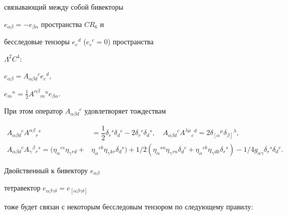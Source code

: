 связывающий между собой бивекторы


$e_{\alpha\beta}=-e_{\beta\alpha}$ пространства $CR_6$ и


бесследовые тензоры $e_c{}^d$ ($e_c{}^c=0$) пространства


$\Lambda^2C^4$:


$e_{\alpha \beta}= A_{\alpha \beta d}{}^ce_c{}^d$,


$e_m{}^n=\frac{1}{2}A^{\alpha\beta}{}_m{}^ne_{\beta\alpha}$.


При этом оператор $A_{\alpha \beta d}{}^c$ удовлетворяет тождествам


\begin{equation}


\begin{split}


A_{\alpha\beta d}{}^cA^{\alpha\beta}{}_r{}^s


&=\dfrac{1}{2}\delta_r{}^s\delta_d{}^c-


2\delta_ r{}^c\delta_d{}^s,\quad


A_{\alpha\beta d}{}^cA^{\lambda\mu}{}_c{}^d=


2\delta_{\left[\alpha \right.}{}^\mu


\delta_{\left.\beta\right]}{}^\lambda,\\


%


A_{\alpha\beta d}{}^cA_\gamma{}^\beta{}_r{}^s=


(\eta_\alpha{}^{cs}\eta_\gamma{}_{rd}+


&\eta_\alpha{}^{ck}\eta_\gamma{}_{kr}\delta_d{}^s)+


1/2(\eta_\alpha{}^{sn}\eta_\gamma{}_{rn}\delta_d{}^c+


\eta_\alpha{}^{ck}\eta_\gamma{}_{dk}\delta_r{}^s)-


1/4g_{\alpha\gamma}\delta_r{}^s\delta_d{}^c.


\end{split}


\tag{2$'$}


\end{equation}


Двойственный к бивектору $e_{\alpha\beta}$


тетравектор $e_{\alpha\beta\gamma\delta}=e_{[\alpha\beta\gamma\delta]}$


тоже будет связан с некоторым бесследовым тензором по следующему правилу:


